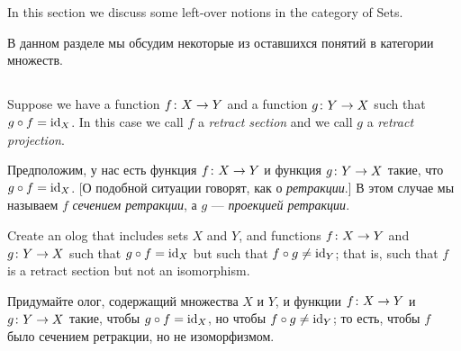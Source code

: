 \documentclass[CT4S-EN-RU]{subfiles}
\begin{document}
\section{}

\begin{blockENG}
In this section we discuss some left-over notions in the category of Sets.
\end{blockENG}

\begin{blockRUS}
В данном разделе мы обсудим некоторые из оставшихся понятий в категории множеств. 
\end{blockRUS}


\subsection{}

\begin{definitionENG}
Suppose we have a function $f\colon X\rightarrow Y$ and a function $g\colon Y\rightarrow X$ such that $g\circ f=\textnormal{id}_X$. In this case we call $f$ a {\em retract section} and we call $g$ a {\em retract projection}. 
\end{definitionENG}

\begin{definitionRUS}
Предположим, у нас есть функция $f\colon X\rightarrow Y$ и функция $g\colon Y\rightarrow X$ такие, что $g\circ f=\textnormal{id}_X$. [О подобной ситуации говорят, как о {\em ретракции}.] В этом случае мы называем $f$ {\em сечением ретракции}, а $g$ — {\em проекцией ретракции}.
\end{definitionRUS}

\begin{exerciseENG}
Create an olog that includes sets $X$ and $Y$, and functions $f\colon X\rightarrow Y$ and $g\colon Y\rightarrow X$ such that $g\circ f=\textnormal{id}_X$ but such that $f\circ g\neq\textnormal{id}_Y$; that is, such that $f$ is a retract section but not an isomorphism.
\end{exerciseENG}

\begin{exerciseRUS}
Придумайте олог, содержащий множества $X$ и $Y$, и функции $f\colon X\rightarrow Y$ и $g\colon Y\rightarrow X$ такие, чтобы $g\circ f=\textnormal{id}_X$, но чтобы $f\circ g\neq\textnormal{id}_Y$; то есть, чтобы $f$ было сечением ретракции, но не изоморфизмом.
\end{exerciseRUS}
\end{document}
